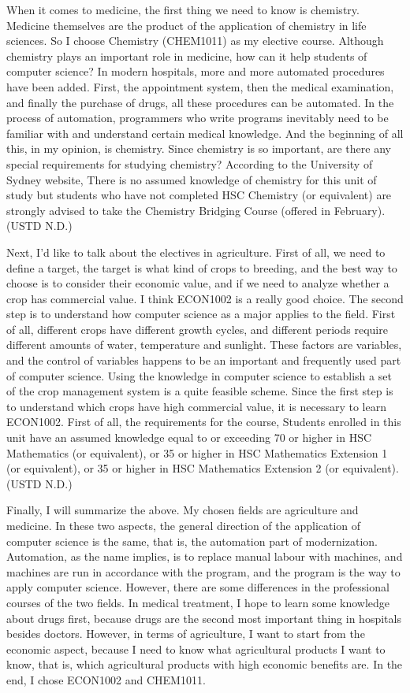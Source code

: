 \documentclass[12pt]{article}
\begin{document}
When it comes to medicine, the first thing we need to know is chemistry. Medicine themselves are the product of the application of chemistry in life sciences. So I choose Chemistry (CHEM1011) as my elective course. Although chemistry plays an important role in medicine, how can it help students of computer science? In modern hospitals, more and more automated procedures have been added. First, the appointment system, then the medical examination, and finally the purchase of drugs, all these procedures can be automated. In the process of automation, programmers who write programs inevitably need to be familiar with and understand certain medical knowledge. And the beginning of all this, in my opinion, is chemistry. Since chemistry is so important, are there any special requirements for studying chemistry? According to the University of Sydney website, There is no assumed knowledge of chemistry for this unit of study but students who have not completed HSC Chemistry (or equivalent) are strongly advised to take the Chemistry Bridging Course (offered in February). (USTD N.D.)

Next, I'd like to talk about the electives in agriculture. First of all, we need to define a target, the target is what kind of crops to breeding, and the best way to choose is to consider their economic value, and if we need to analyze whether a crop has commercial value. I think ECON1002 is a really good choice. The second step is to understand how computer science as a major applies to the field. First of all, different crops have different growth cycles, and different periods require different amounts of water, temperature and sunlight. These factors are variables, and the control of variables happens to be an important and frequently used part of computer science. Using the knowledge in computer science to establish a set of the crop management system is a quite feasible scheme. Since the first step is to understand which crops have high commercial value, it is necessary to learn ECON1002. First of all, the requirements for the course, Students enrolled in this unit have an assumed knowledge equal to or exceeding 70 or higher in HSC Mathematics (or equivalent), or 35 or higher in HSC Mathematics Extension 1 (or equivalent), or 35 or higher in HSC Mathematics Extension 2 (or equivalent). (USTD N.D.)

Finally, I will summarize the above. My chosen fields are agriculture and medicine. In these two aspects, the general direction of the application of computer science is the same, that is, the automation part of modernization. Automation, as the name implies, is to replace manual labour with machines, and machines are run in accordance with the program, and the program is the way to apply computer science. However, there are some differences in the professional courses of the two fields. In medical treatment, I hope to learn some knowledge about drugs first, because drugs are the second most important thing in hospitals besides doctors. However, in terms of agriculture, I want to start from the economic aspect, because I need to know what agricultural products I want to know, that is, which agricultural products with high economic benefits are. In the end, I chose ECON1002 and CHEM1011.
\end{document}
